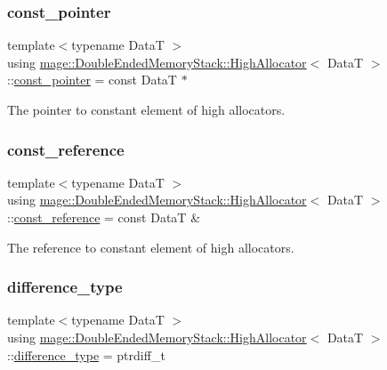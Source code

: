 \subsubsection{\texorpdfstring{const\+\_\+pointer}{const\_pointer}}
{\footnotesize\ttfamily template$<$typename DataT $>$ \\
using \hyperlink{structmage_1_1_double_ended_memory_stack_1_1_high_allocator}{mage\+::\+Double\+Ended\+Memory\+Stack\+::\+High\+Allocator}$<$ DataT $>$\+::\hyperlink{structmage_1_1_double_ended_memory_stack_1_1_high_allocator_ab0d52e1c59565e79f3bd5f0f02e65966}{const\+\_\+pointer} =  const DataT $\ast$}

The pointer to constant element of high allocators. \hypertarget{structmage_1_1_double_ended_memory_stack_1_1_high_allocator_a7f30fe90c403660a55f0ac05891f7ec1}{}\label{structmage_1_1_double_ended_memory_stack_1_1_high_allocator_a7f30fe90c403660a55f0ac05891f7ec1} 
\subsubsection{\texorpdfstring{const\+\_\+reference}{const\_reference}}
{\footnotesize\ttfamily template$<$typename DataT $>$ \\
using \hyperlink{structmage_1_1_double_ended_memory_stack_1_1_high_allocator}{mage\+::\+Double\+Ended\+Memory\+Stack\+::\+High\+Allocator}$<$ DataT $>$\+::\hyperlink{structmage_1_1_double_ended_memory_stack_1_1_high_allocator_a7f30fe90c403660a55f0ac05891f7ec1}{const\+\_\+reference} =  const DataT \&}

The reference to constant element of high allocators. \hypertarget{structmage_1_1_double_ended_memory_stack_1_1_high_allocator_a7b3fd8c4d6000165eac95eca43b28a66}{}\label{structmage_1_1_double_ended_memory_stack_1_1_high_allocator_a7b3fd8c4d6000165eac95eca43b28a66} 
\subsubsection{\texorpdfstring{difference\+\_\+type}{difference\_type}}
{\footnotesize\ttfamily template$<$typename DataT $>$ \\
using \hyperlink{structmage_1_1_double_ended_memory_stack_1_1_high_allocator}{mage\+::\+Double\+Ended\+Memory\+Stack\+::\+High\+Allocator}$<$ DataT $>$\+::\hyperlink{structmage_1_1_double_ended_memory_stack_1_1_high_allocator_a7b3fd8c4d6000165eac95eca43b28a66}{difference\+\_\+type} =  ptrdiff\+\_\+t}

